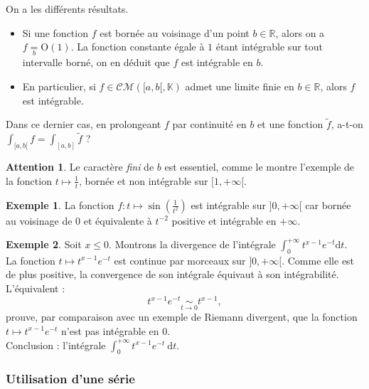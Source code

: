 \documentclass[french]{article}
\newcommand{\R}{\mathbb{R}}
\newcommand{\K}{\mathbb{K}}
\renewcommand{\O}{\text{O}}
\renewcommand{\d}{\text{d}}
\theoremstyle{plain}
\theoremstyle{definition}
\newtheorem*{ex}{Exemple}
\newtheorem*{attention}{Attention}
\theoremstyle{remark}
\begin{document}
\begin{met}
	On a les différents résultats.
	\begin{itemize}
		\item Si une fonction $f$ est bornée au voisinage d'un point $b\in\R$, alors on a $f\underset{b}{=}\O(1)$. La fonction constante égale à $1$ étant intégrable sur tout intervalle borné, on en déduit que $f$ est intégrable en $b$.
		\item En particulier, si $f\in\mathcal{CM}([a,b[,\K)$ admet une limite finie en $b\in\R$, alors $f$ est intégrable.
	\end{itemize}
\end{met}

\begin{exo}
	Dans ce dernier cas, en prolongeant $f$ par continuité en $b$ et une fonction $\tilde{f}$, a-t-on $\displaystyle\int_{[a,b[}f=\int_{[a,b]}\tilde{f}$ ? %
\end{exo}

\begin{attention}
	Le caractère \textit{fini} de $b$ est essentiel, comme le montre l'exemple de la fonction $t\mapsto\displaystyle\frac{1}{t}$, bornée et non intégrable sur $[1,+\infty[$.
\end{attention}

\begin{ex}
	La fonction $f:t\mapsto\sin\left(\frac{1}{t^2}\right)$ est intégrable sur $]0,+\infty[$ car bornée au voisinage de $0$ et équivalente à $t^{-2}$ positive et intégrable en $+\infty$.
\end{ex}

\begin{ex}
	Soit $x\leqslant0$. Montrons la divergence de l'intégrale $\displaystyle\int_{0}^{+\infty}t^{x-1}e^{-t}\d t$.\\
	La fonction $t\mapsto t^{x-1}e^{-t}$ est continue par morceaux sur $]0,+\infty[$. Comme elle est de plus positive, la convergence de son intégrale équivaut à son intégrabilité. L'équivalent : $$t^{x-1}e^{-t}\underset{t\to0}{\sim}t^{x-1},$$ prouve, par comparaison avec un exemple de Riemann divergent, que la fonction $t\mapsto t^{x-1}e^{-t}$ n'est pas intégrable en $0$.\\
	Conclusion : l'intégrale $\displaystyle\int_{0}^{+\infty}t^{x-1}e^{-t}\ \d t$.
\end{ex}

\subsubsection*{Utilisation d'une série}
\end{document}
